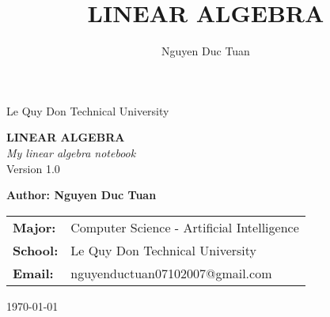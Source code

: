 \documentclass[12pt, a4paper, oneside]{book}
\title{LINEAR ALGEBRA}
\author{Nguyen Duc Tuan}
\begin{document}
\frontmatter 

\begin{titlepage}
    \centering %
    

    {\large Le Quy Don Technical University} \\
    \vspace{0.25cm}
   
    
    \vfill %
    
    {\Huge \bfseries LINEAR ALGEBRA} \\
    \vspace{0.5cm}
    {\Large \itshape My linear algebra notebook} \\
    \vspace{1cm}
    {\large Version 1.0} \\ %
    
    \vfill %
    
    {\Large \bfseries Author: Nguyen Duc Tuan}
    \vspace{0.5cm}
    
    \begin{tabular}{l l}
        \bfseries Major: & Computer Science - Artificial Intelligence \\
        \bfseries School: & Le Quy Don Technical University \\
        \bfseries Email: & nguyenductuan07102007@gmail.com \\
    \end{tabular}
    
    \vspace{1cm}
    
    {\large \today}

\end{titlepage}

\tableofcontents 

\mainmatter 

 

\end{document}

